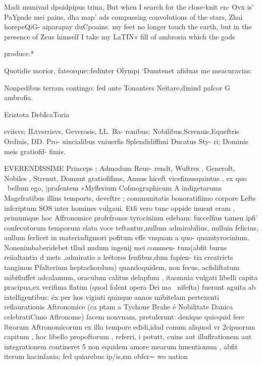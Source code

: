 \documentclass{article}
\begin{document}
Madi munivad dpoidpipus trina, But when I search for the close-knit en-
Ovx is’ PaYpade mei pains, dha map’ ads compassing convolutions of the stars,
Zhai horepeQiG- aiparapay duCpoains. my feet no longer touch the earth, but in
the presence of Zeus himself I take my
LaTIN« fill of ambrosia which the gods

produce.*

Quotidie morior, fateorque::fedinter Olympi
‘Dumtenet afiduas me meacuravias:

Nonpedibus terram contingo: fed ante Tonanters
Neitare,dinind pafcor G ambrofia.


Eristota DebIcaToria

sviisvs; ILtvsrrisvs, Geverosis, LL. Ba-
ronibus; Nobilibus,Screnuis,Equeftris Ordinis, DD. Pro-
uincialibus vniuerfis Splendidiffimi Ducatus Sty-
ri; Dominis meis gratiofif-
fimis.

EVERENDISSIME Princeps ; Admodum Reue-
rendt, Wuftres , Generoft, Nobiles , Strenut, Domunt
gratiofifims, Annus hiceft vicefimusquintus , ex quo
\ bellum ego, |prafentem »Myflerium Cofmographicum
A indigetarums Magefratibus illins temports, deveftre
; communitatis bonoratifiimo corpore Lefts infcriptum
SOS inter homines vulgaui. Etfi vero tunc oppide inuent
eram , primumque hoc Affronomice profefronss tyrocininm edebam: fuccelfius
tamen ipfi' confecutorum temporum elata voce teftantur,nullum admirabilius,
nulluin felicius, aullum ferlicet in materiadigmori pofitum effe vnquam a quo-
quamtyrocinium. Nonenimbaberidebet tllud nudum ingenij mei commen-
tum(abfit burns reiialtantia d mets ,admiratio a leétorss fenfibus,dum fapien-
tia creatricts tangimus Pfalterium heptachordum) quandoquidem, non fecus,
acfidiftatum mibifiuffet adcalamum, oraculum calitus delapfum , itaomnia
vulgati libelli capita pracipua,ex verifima flatim (quod folent opera Dei ma~
nifefta) fuerunt aguita ab iatelligentibus: éx per hos viginti quinque annos
mibitelam pertexenti reflaurationis Aftronomice (ca ptam a Tychone Brahe é
Nobilitate Danica celebratiCimo Aflronome) facem nonvnam, pretulerunt:
denique quicquid fere lbrorum Aftronomicorum ex illo tempore edidi,idad
conum aliquod vr 2cipuorum capitum , hoc libello propoftorum , referri, i potutt,
cuins aut illuflrationem aut integrationem contineret 5 non equidem amore
mearum inuentionum , abfit iterum hacinfania; fed quiarebus ip/is,¢m obfer=
wo uation
\end{document}
